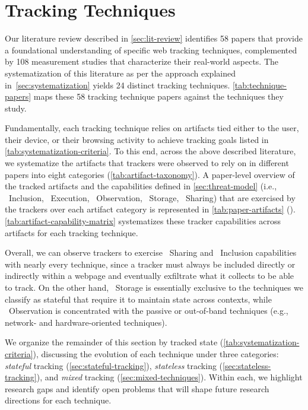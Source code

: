 \section{Tracking Techniques}
\label{sec:tracking-techniques}

Our literature review described in \autoref{sec:lit-review} identifies 58 papers that provide a foundational understanding of specific web tracking techniques, complemented by 108 measurement studies that characterize their real-world aspects.
%
The systematization of this literature as per the approach explained in~\autoref{sec:systematization} yields 24 distinct tracking techniques.
%
\autoref{tab:technique-papers} maps these 58 tracking technique papers against the techniques they study.


Fundamentally, each tracking technique relies on artifacts tied either to the user, their device, or their browsing activity to achieve tracking goals listed in \autoref{tab:systematization-criteria}.
%
To this end, across the above described literature, we systematize the artifacts that trackers were observed to rely on in different papers into eight categories (\autoref{tab:artifact-taxonomy}). 
%
A paper-level overview of the tracked artifacts and the capabilities defined in \autoref{sec:threat-model} (i.e., \symInclusion~Inclusion, \symExecution~Execution, \symObservation~Observation, \symStorage~Storage, \symSharing~Sharing) that are exercised by the trackers over each artifact category is represented in \autoref{tab:paper-artifacts} (). 
%
\autoref{tab:artifact-capability-matrix} systematizes these tracker capabilities across artifacts for each tracking technique. 


Overall, we can observe trackers to exercise \symSharing~Sharing and \symInclusion~Inclusion capabilities with nearly every technique, since a tracker must always be included directly or indirectly within a webpage and eventually exfiltrate what it collects to be able to track. 
%
On the other hand, \symStorage~Storage is essentially exclusive to the techniques we classify as stateful that require it to maintain state across contexts, while \symObservation~Observation is concentrated with the passive or out-of-band techniques (e.g., network- and hardware-oriented techniques).





We organize the remainder of this section by tracked state (\autoref{tab:systematization-criteria}), discussing the evolution of each technique under three categories: \textit{stateful} tracking (\autoref{sec:stateful-tracking}), \textit{stateless} tracking (\autoref{sec:stateless-tracking}), and \textit{mixed} tracking (\autoref{sec:mixed-techniques}).
%
Within each, we highlight research gaps and identify open problems that will shape future research directions for each technique.
%


